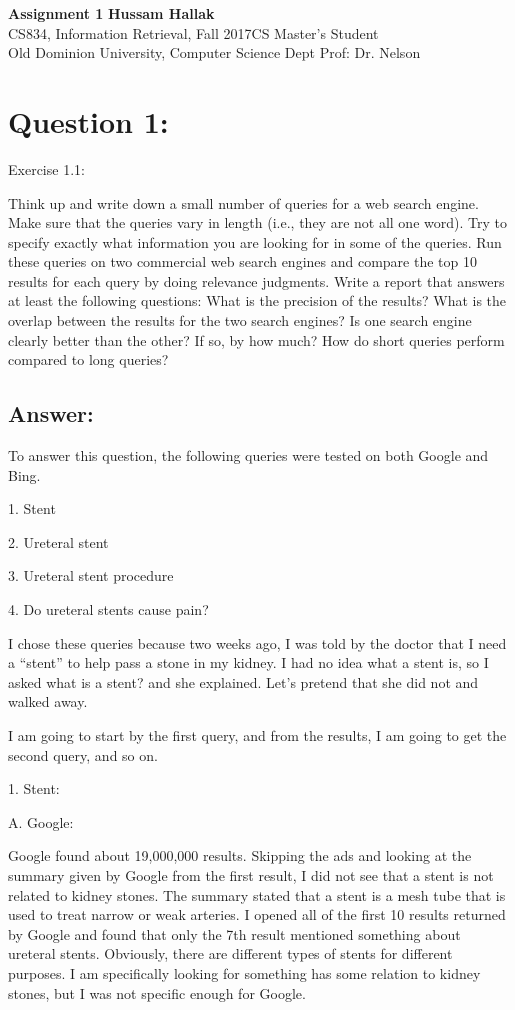 \documentclass[a4paper, 11pt]{article}
\begin{document}
\noindent
\large\textbf{Assignment 1} \hfill \textbf{Hussam Hallak} \\
\normalsize CS834, Information Retrieval, Fall 2017\hfill CS Master's Student \\
Old Dominion University, Computer Science Dept \hfill Prof: Dr. Nelson 

\section*{Question 1:}
Exercise 1.1: 

Think up and write down a small number of queries for a web search engine.
Make sure that the queries vary in length (i.e., they are not all one word). Try
to specify exactly what information you are looking for in some of the queries.
Run these queries on two commercial web search engines and compare the top
10 results for each query by doing relevance judgments. Write a report that answers
at least the following questions: What is the precision of the results? What
is the overlap between the results for the two search engines? Is one search engine
clearly better than the other? If so, by how much? How do short queries perform
compared to long queries?

\subsection*{Answer:}
To answer this question, the following queries were tested on both Google and Bing. 

1. Stent

2. Ureteral stent

3. Ureteral stent procedure

4. Do ureteral stents cause pain?

I chose these queries because two weeks ago, I was told by the doctor that I need a ``stent'' to help pass a stone in my kidney. I had no idea what a stent is, so I asked what is a stent? and she explained. Let's pretend that she did not and walked away.

I am going to start by the first query, and from the results, I am going to get the second query, and so on. 

1. Stent:

A. Google:

Google found about 19,000,000 results. Skipping the ads and looking at the summary given by Google from the first result, I did not see that a stent is not related to kidney stones. The summary stated that a stent is a mesh tube that is used to treat narrow or weak arteries. I opened all of the first 10 results returned by Google and found that only the 7th result mentioned something about ureteral stents. Obviously, there are different types of stents for different purposes. I am specifically looking for something has some relation to kidney stones, but I was not specific enough for Google.
\end{document}
